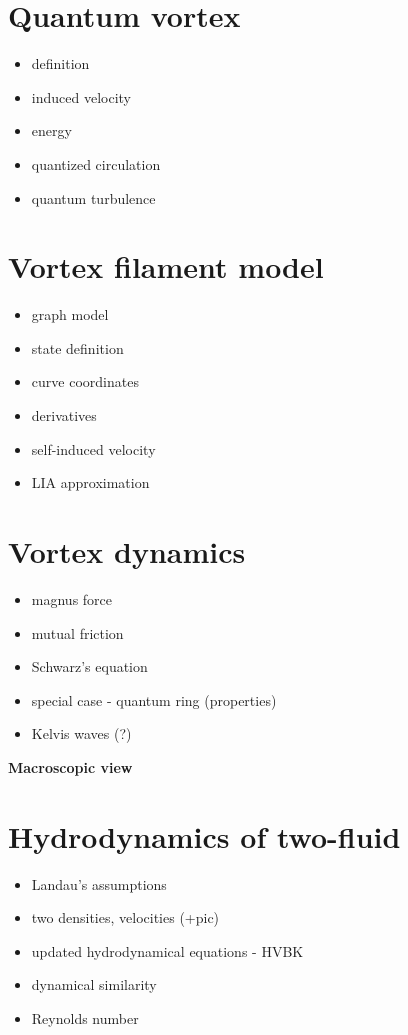 \documentclass[a4paper, 12pt]{report}
\newcommand{\<}{\langle} %
\renewcommand{\>}{\rangle} %
\begin{document}
\section{Quantum vortex}
\begin{itemize}
	\item definition
	\item induced velocity
	\item energy
	\item quantized circulation
	\item quantum turbulence
\end{itemize}

\section{Vortex filament model}
\begin{itemize}
	\item graph model
	\item state definition
	\item curve coordinates
	\item derivatives
	\item self-induced velocity
	\item LIA approximation
\end{itemize}

\section{Vortex dynamics}
\begin{itemize}
	\item magnus force
	\item mutual friction
	\item Schwarz's equation
	\item special case - quantum ring (properties)
	\item Kelvis waves (?)
\end{itemize}

\newpage

{\Huge \bfseries Macroscopic view}
\vspace{0.3cm}

\section{Hydrodynamics of two-fluid}
\begin{itemize}
	\item Landau's assumptions
	\item two densities, velocities (+pic)
	\item updated hydrodynamical equations - HVBK
	\item dynamical similarity
	\item Reynolds number
\end{itemize}
\end{document}
